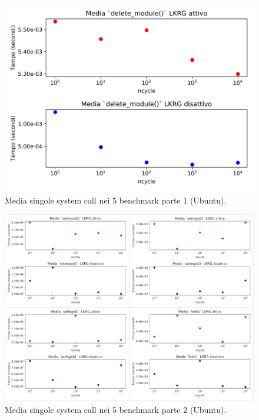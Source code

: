 \begin{figure}[!htbp]
\centering
\includegraphics[scale=0.18]{Figures/Ubuntu/Mean1}
\caption[Media singole system call nei 5 benchmark parte 1 (Ubuntu)]{Media singole system call nei 5 benchmark parte 1 (Ubuntu).}
\label{fig:mean1UbuntuFig}
\end{figure}

\begin{figure}[!htbp]
\centering
\includegraphics[scale=1.3]{Figures/Ubuntu/Mean2}
\caption[Media singole system call nei 5 benchmark parte 2 (Ubuntu)]{Media singole system call nei 5 benchmark parte 2 (Ubuntu).}
\label{fig:mean2UbuntuFig}
\end{figure}

